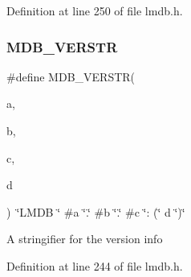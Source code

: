 Definition at line 250 of file lmdb.\+h.

\mbox{\label{group___version_ga1e8ad3b918e27a5a55179c1ab4b2e0d1}} 
\subsubsection{\texorpdfstring{M\+D\+B\+\_\+\+V\+E\+R\+S\+TR}{MDB\_VERSTR}}
{\footnotesize\ttfamily \#define M\+D\+B\+\_\+\+V\+E\+R\+S\+TR(\begin{DoxyParamCaption}\item[{}]{a,  }\item[{}]{b,  }\item[{}]{c,  }\item[{}]{d }\end{DoxyParamCaption})~\char`\"{}L\+M\+DB \char`\"{} \#a \char`\"{}.\char`\"{} \#b \char`\"{}.\char`\"{} \#c \char`\"{}\+: (\char`\"{} d \char`\"{})\char`\"{}}

A stringifier for the version info 

Definition at line 244 of file lmdb.\+h.

